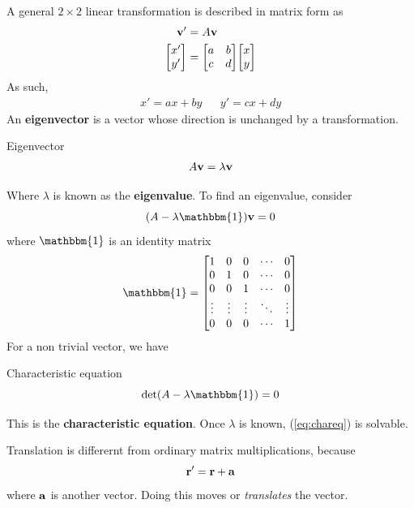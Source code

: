 			A general $2\times2$ linear transformation is described in matrix form as 
			\begin{align}
				\vb{v}' &= A \vb{v}\\
				\mqty[x'\\y'] &= \mqty[a&b\\c&d] \mqty[x\\y]
			\end{align}
			As such,
			\begin{align}
				x' =  ax + by && y' = cx + dy
			\end{align}
			An \textbf{eigenvector} is a vector whose direction is unchanged by a transformation.
			\begin{definition}{Eigenvector}
			    \begin{equation}
					A\vb{v} =\lambda \vb{v}
			    \end{equation}
			\end{definition}
			Where $\lambda$ is known as the \textbf{eigenvalue}. To find an eigenvalue, consider
			\begin{equation}
				(A - \lambda \mathbbm{1})\vb{v} = 0
			\end{equation}
			where $\mathbbm{1}$ is an identity matrix
			\begin{equation}
				\mathbbm{1} = \mqty[
					1 & 0 & 0 & \cdots & 0 \\
					0 & 1 & 0 & \cdots & 0 \\
					0 & 0 & 1 & \cdots & 0 \\
					\vdots & \vdots & \vdots & \ddots & \vdots \\
					0 & 0 & 0 & \cdots & 1
				]
			\end{equation}
			For a non trivial vector, we have
			\begin{definition}{Characteristic equation}
			\begin{equation} \label{eq:chareq}
				\det(A-\lambda \mathbbm{1}) = 0 
			\end{equation}
			\end{definition}
			This is the \textbf{characteristic equation}. Once $\lambda$ is known, (\ref{eq:chareq}) is solvable.
			
			Translation is differernt from ordinary matrix multiplications, because
			\begin{equation}
				\vb{r}' = \vb{r} + \vb{a}
			\end{equation}
			where $\vb{a}$ is another vector. Doing this moves or \textit{translates} the vector.
			
